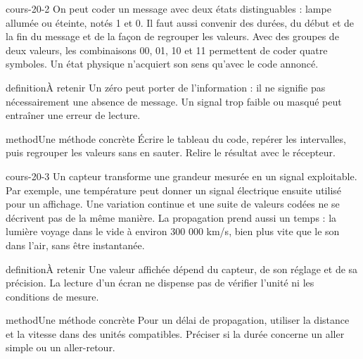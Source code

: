 \documentclass[12pt,twoside,openany]{book}
\begin{document}
\begin{pcFiche}{cours-20-2}
On peut coder un message avec deux états distinguables : lampe allumée ou éteinte, notés 1 et 0. Il faut aussi convenir des durées, du début et de la fin du message et de la façon de regrouper les valeurs. Avec des groupes de deux valeurs, les combinaisons 00, 01, 10 et 11 permettent de coder quatre symboles. Un état physique n’acquiert son sens qu’avec le code annoncé.\par
{}
\begin{pcEncadre}{definition}{À retenir}
Un zéro peut porter de l’information : il ne signifie pas nécessairement une absence de message. Un signal trop faible ou masqué peut entraîner une erreur de lecture.\par
\end{pcEncadre}
\begin{pcEncadre}{method}{Une méthode concrète}
Écrire le tableau du code, repérer les intervalles, puis regrouper les valeurs sans en sauter. Relire le résultat avec le récepteur.\par
\end{pcEncadre}
\end{pcFiche}
\label{ch-20-cours-3}
\begin{pcFiche}{cours-20-3}
Un capteur transforme une grandeur mesurée en un signal exploitable. Par exemple, une température peut donner un signal électrique ensuite utilisé pour un affichage. Une variation continue et une suite de valeurs codées ne se décrivent pas de la même manière. La propagation prend aussi un temps : la lumière voyage dans le vide à environ 300 000 km/s, bien plus vite que le son dans l’air, sans être instantanée.\par
{}
\begin{pcEncadre}{definition}{À retenir}
Une valeur affichée dépend du capteur, de son réglage et de sa précision. La lecture d’un écran ne dispense pas de vérifier l’unité ni les conditions de mesure.\par
\end{pcEncadre}
\begin{pcEncadre}{method}{Une méthode concrète}
Pour un délai de propagation, utiliser la distance et la vitesse dans des unités compatibles. Préciser si la durée concerne un aller simple ou un aller-retour.\par
\end{pcEncadre}
\end{pcFiche}
\end{document}
